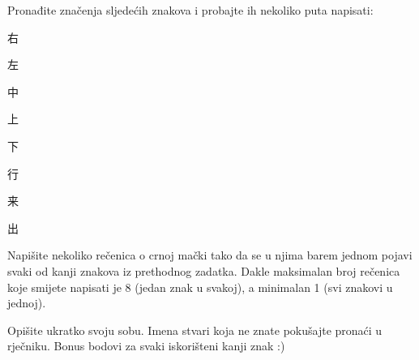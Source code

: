 
\author{Tomislav Mamić}

	
	\begin{mondai}{Pronađite značenja sljedećih znakova i probajte ih nekoliko puta napisati:}
		\item 右
		\item 左
		\item 中
		\item 上
		\item 下
		\item 行
		\item 来
		\item 出
	\end{mondai}

	\noindent Napišite nekoliko rečenica o crnoj mački tako da se u njima barem jednom pojavi svaki od kanji znakova iz prethodnog zadatka. Dakle maksimalan broj rečenica koje smijete napisati je 8 (jedan znak u svakoj), a minimalan 1 (svi znakovi u jednoj).
	
	\vspace{20pt}
	\noindent Opišite ukratko svoju sobu. Imena stvari koja ne znate pokušajte pronaći u rječniku. Bonus bodovi za svaki iskorišteni kanji znak :)
